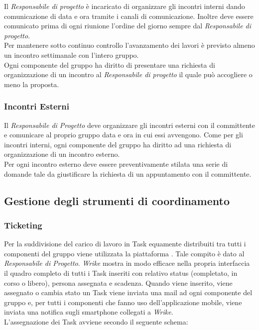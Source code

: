 \documentclass[./../NomeDocumento.tex]{subfiles}
\begin{document}
	Il \textit{Responsabile di progetto} è incaricato di organizzare gli incontri interni dando comunicazione di data e ora tramite i canali di comunicazione. Inoltre deve essere comunicato prima di ogni riunione l'ordine del giorno sempre dal \textit{Responsabile di progetto}.
	\\ \noindent Per mantenere sotto continuo controllo l'avanzamento dei lavori è previsto almeno un incontro settimanale con l'intero gruppo.
	\\ \noindent Ogni componente del gruppo ha diritto di presentare una richiesta di organizzazione di un incontro al \textit{Responsabile di progetto} il quale può accogliere o meno la proposta.
	
	\subsubsection{Incontri Esterni}
	
	Il \textit{Responsabile di Progetto} deve organizzare gli incontri esterni con il committente e comunicare al proprio gruppo data e ora in cui essi avvengono. Come per gli incontri interni, ogni componente del gruppo ha diritto ad una richiesta di organizzazione di un incontro esterno.
	\\ \noindent Per ogni incontro esterno deve essere preventivamente stilata una serie di domande tale da giustificare la richiesta di un appuntamento con il committente.
	
	\subsection{Gestione degli strumenti di coordinamento}
	
	\subsubsection{Ticketing}
	
	Per la suddivisione del carico di lavoro in Task equamente distribuiti tra tutti i componenti del gruppo viene utilizzata la piattaforma . Tale compito è dato al \textit{Responsabile di Progetto}. \textit{Wrike} mostra in modo efficace nella propria interfaccia il quadro completo di tutti i Task inseriti con relativo status (completato, in corso o libero), persona assegnata e scadenza. Quando viene inserito, viene assegnato o cambia stato un Task viene inviata una mail ad ogni componente del gruppo e, per tutti i componenti che fanno uso dell'applicazione mobile, viene inviata una notifica sugli smartphone collegati a \textit{Wrike}.
	\\ \noindent L'assegnazione dei Task avviene secondo il seguente schema:
	
\end{document}
